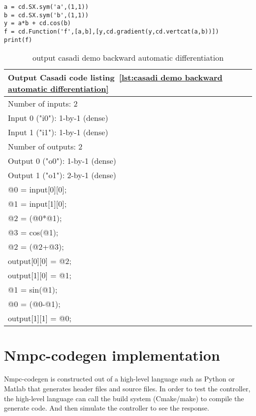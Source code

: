 \begin{lstlisting}[caption={Casadi code example automatic backward differentiation},label={lst:casadi demo backward automatic differentiation}]
a = cd.SX.sym('a',(1,1))
b = cd.SX.sym('b',(1,1))
y = a*b + cd.cos(b)
f = cd.Function('f',[a,b],[y,cd.gradient(y,cd.vertcat(a,b))])
print(f)
\end{lstlisting}

\begin{table}
	\begin{center}
		\begin{tabular}{ |l|  }
			\hline
			Output Casadi code listing~\ref{lst:casadi demo backward automatic differentiation} \\
			\hline
			Number of inputs: 2 \\
			Input 0 ("i0"): 1-by-1 (dense) \\
			Input 1 ("i1"): 1-by-1 (dense) \\
			Number of outputs: 2 \\
			Output 0 ("o0"): 1-by-1 (dense) \\
			Output 1 ("o1"): 2-by-1 (dense) \\
			@0 = input[0][0]; \\
			@1 = input[1][0]; \\
			@2 = (@0*@1); \\
			@3 = cos(@1); \\
			@2 = (@2+@3); \\
			output[0][0] = @2; \\
			output[1][0] = @1; \\
			@1 = sin(@1); \\
			@0 = (@0-@1); \\
			output[1][1] = @0; \\
			\hline   
		\end{tabular}
		\caption{output casadi demo backward automatic differentiation}
		\label{tbl:output casadi demo backward automatic differentiation}
	\end{center}
\end{table}


\section{Nmpc-codegen implementation}
Nmpc-codegen is constructed out of a high-level language such as Python or Matlab that generates header files and source files. In order to test the controller, the high-level language can call the build system (Cmake/make) to compile the generate code. And then simulate the controller to see the response.

